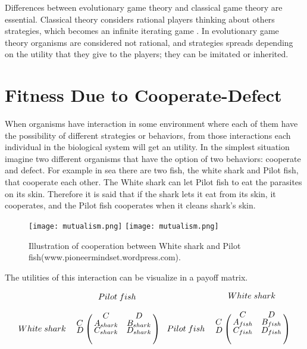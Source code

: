 Differences between evolutionary game theory and classical game theory are essential. Classical theory considers rational players thinking about others strategies, which becomes an infinite iterating game \cite{Traulsen2009}. In evolutionary game theory organisms are considered not rational, and strategies spreads depending on the utility that they give to the players; they can be imitated or inherited.   

\section{Fitness Due to Cooperate-Defect}
When organisms have interaction in some environment where each of them have the possibility of different strategies or behaviors, from those interactions each individual in the biological system will get an utility. In the simplest situation imagine  two different organisms that have the option of two behaviors: cooperate and defect. For example in sea there are two fish, the white shark and Pilot fish, that cooperate each other.  The White shark can let Pilot fish to eat the parasites on its skin. Therefore it is said that if the shark lets it eat from its skin, it cooperates, and the Pilot fish cooperates when it cleans shark's skin. 
\begin{figure}[H]
 \begin{center}
    \leavevmode
    \ifpdf
      \texttt{[image: mutualism.png]}
    \else
     \texttt{[image: mutualism.png]}
    \fi
    \caption{\footnotesize Illustration of cooperation between White shark and Pilot fish(www.pioneermindset.wordpress.com).}  
    \label{Fig51}
  \end{center}
  \end{figure}

The utilities of this interaction can be visualize in a payoff matrix.

\begin{equation*}
\begin{matrix}
    & Pilot\; fish \\
 White\; shark & {\bordermatrix{~ & C& D \cr
                            C & A_{shark} & B_{shark} \cr
                            D & C_{shark} & D_{shark} \cr}} 
 \end{matrix}\;\;\;
 \begin{matrix}
    & White \; shark \\
 Pilot\; fish & {\bordermatrix{~ & C& D \cr
                            C & A_{fish} & B_{fish} \cr
                            D & C_{fish} & D_{fish} \cr}} 
\end{matrix}
\end{equation*}

